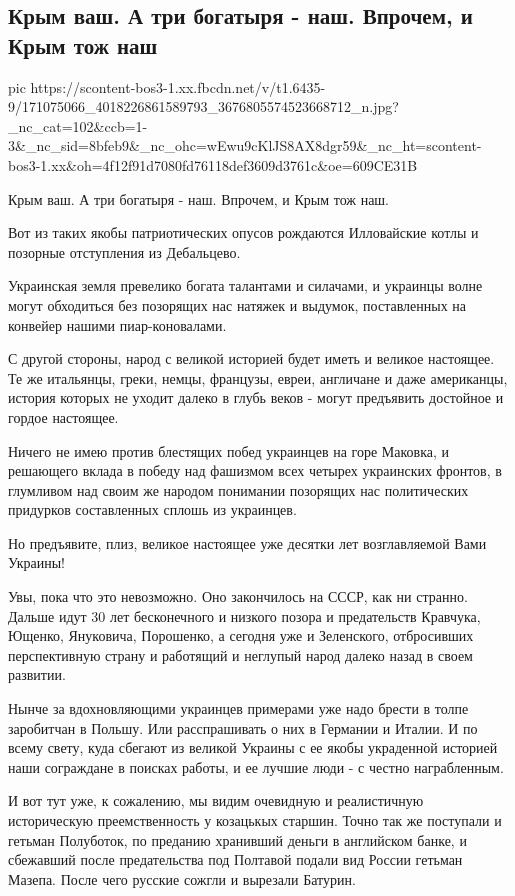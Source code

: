  
 
 
 
 

\subsection{Крым ваш. А три богатыря - наш. Впрочем, и Крым тож наш}

\ifcmt
  pic https://scontent-bos3-1.xx.fbcdn.net/v/t1.6435-9/171075066_4018226861589793_3676805574523668712_n.jpg?_nc_cat=102&ccb=1-3&_nc_sid=8bfeb9&_nc_ohc=wEwu9cKlJS8AX8dgr59&_nc_ht=scontent-bos3-1.xx&oh=4f12f91d7080fd76118def3609d3761c&oe=609CE31B
\fi

Крым ваш. А три богатыря - наш. Впрочем, и Крым тож наш.

Вот из таких якобы патриотических опусов рождаются Илловайские котлы и позорные отступления из Дебальцево.

Украинская земля  превелико богата талантами и силачами, и украинцы волне могут
обходиться без позорящих нас натяжек и выдумок, поставленных на конвейер нашими
пиар-коновалами.

С другой стороны, народ с великой историей будет иметь и великое настоящее. Те
же итальянцы, греки, немцы, французы, евреи, англичане и даже американцы,
история которых не уходит далеко в глубь веков - могут предъявить достойное и
гордое настоящее.

Ничего не имею против блестящих побед украинцев на горе Маковка, и решающего
вклада в победу над фашизмом всех четырех украинских фронтов, в глумливом над
своим же народом понимании позорящих нас политических придурков составленных
сплошь из украинцев.

Но предъявите, плиз, великое настоящее уже десятки лет возглавляемой Вами Украины!

Увы, пока что это невозможно. Оно закончилось на СССР, как ни странно. Дальше
идут 30 лет бесконечного и низкого позора и предательств Кравчука, Ющенко,
Януковича, Порошенко, а сегодня уже и Зеленского, отбросивших перспективную
страну и работящий и неглупый народ далеко назад в своем развитии.

Нынче за вдохновляющими украинцев примерами уже надо брести в толпе заробитчан
в Польшу. Или расспрашивать о них в Германии и Италии. И по всему свету, куда
сбегают из великой Украины с ее якобы украденной историей наши сограждане в
поисках работы, и ее лучшие люди - с честно награбленным.

И вот тут уже, к сожалению, мы видим очевидную и реалистичную историческую
преемственность у козацькых старшин. Точно так же поступали и гетьман
Полуботок, по преданию хранивший деньги в английском банке, и сбежавший после
предательства под Полтавой подали вид России гетьман Мазепа. После чего русские
сожгли и вырезали Батурин.


